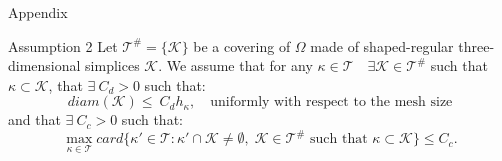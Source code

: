 \documentclass{beamer}
\begin{document}
\begin{frame}{Appendix}
	\begin{block}{Assumption 2}
		Let $\mathcal{T}^\# = \{ \mathcal{K} \}$ be a covering of $\Omega$ made
		of shaped-regular three-dimensional simplices $\mathcal{K}$. We assume
		that for any $\kappa\in\mathcal{T} \quad
		\exists\mathcal{K}\in\mathcal{T}^\#$
		such that $\kappa\subset\mathcal{K}$, that $\exists~C_d>0$ such that:
		\begin{equation*}
			diam(\mathcal{K})\leq~C_dh_\kappa, \quad \text{uniformly with
			respect to the mesh size}
		\end{equation*}
		and that $\exists~C_c>0$ such that:
		\begin{equation*}
			\max\limits_{\kappa \in \mathcal{T}} card \big\{ \kappa' \in
			\mathcal{T} : \kappa' \cap \mathcal{K} \ne \emptyset, \;
			\mathcal{K} \in \mathcal{T}^\# \text{ such that } \kappa \subset
			\mathcal{K} \big\} \leq C_c.
		\end{equation*}
	\end{block}
\end{frame}
\end{document}
